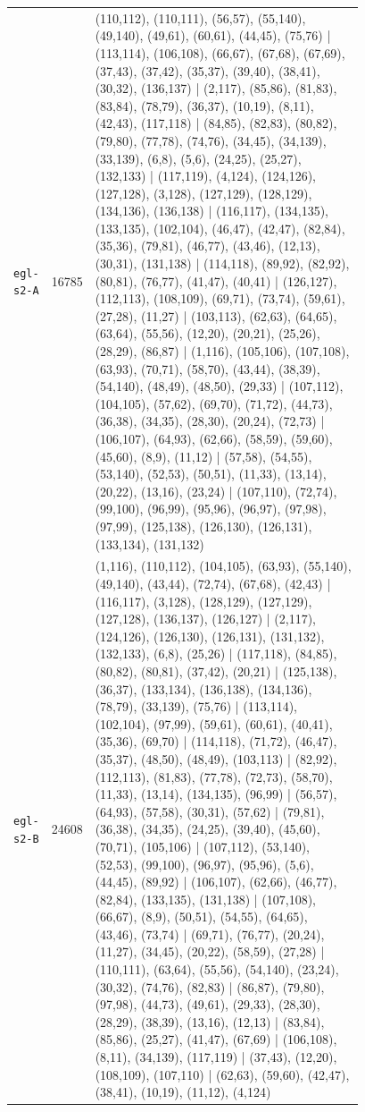 \begin{landscape}
\begin{longtable}{lr>{\tiny\raggedright\arraybackslash}p{0.78\linewidth}}
\texttt{egl-s2-A} & 16785 & (110,112), (110,111), (56,57), (55,140), (49,140), (49,61), (60,61), (44,45), (75,76) | (113,114), (106,108), (66,67), (67,68), (67,69), (37,43), (37,42), (35,37), (39,40), (38,41), (30,32), (136,137) | (2,117), (85,86), (81,83), (83,84), (78,79), (36,37), (10,19), (8,11), (42,43), (117,118) | (84,85), (82,83), (80,82), (79,80), (77,78), (74,76), (34,45), (34,139), (33,139), (6,8), (5,6), (24,25), (25,27), (132,133) | (117,119), (4,124), (124,126), (127,128), (3,128), (127,129), (128,129), (134,136), (136,138) | (116,117), (134,135), (133,135), (102,104), (46,47), (42,47), (82,84), (35,36), (79,81), (46,77), (43,46), (12,13), (30,31), (131,138) | (114,118), (89,92), (82,92), (80,81), (76,77), (41,47), (40,41) | (126,127), (112,113), (108,109), (69,71), (73,74), (59,61), (27,28), (11,27) | (103,113), (62,63), (64,65), (63,64), (55,56), (12,20), (20,21), (25,26), (28,29), (86,87) | (1,116), (105,106), (107,108), (63,93), (70,71), (58,70), (43,44), (38,39), (54,140), (48,49), (48,50), (29,33) | (107,112), (104,105), (57,62), (69,70), (71,72), (44,73), (36,38), (34,35), (28,30), (20,24), (72,73) | (106,107), (64,93), (62,66), (58,59), (59,60), (45,60), (8,9), (11,12) | (57,58), (54,55), (53,140), (52,53), (50,51), (11,33), (13,14), (20,22), (13,16), (23,24) | (107,110), (72,74), (99,100), (96,99), (95,96), (96,97), (97,98), (97,99), (125,138), (126,130), (126,131), (133,134), (131,132) \\[2pt]
\texttt{egl-s2-B} & 24608 & (1,116), (110,112), (104,105), (63,93), (55,140), (49,140), (43,44), (72,74), (67,68), (42,43) | (116,117), (3,128), (128,129), (127,129), (127,128), (136,137), (126,127) | (2,117), (124,126), (126,130), (126,131), (131,132), (132,133), (6,8), (25,26) | (117,118), (84,85), (80,82), (80,81), (37,42), (20,21) | (125,138), (36,37), (133,134), (136,138), (134,136), (78,79), (33,139), (75,76) | (113,114), (102,104), (97,99), (59,61), (60,61), (40,41), (35,36), (69,70) | (114,118), (71,72), (46,47), (35,37), (48,50), (48,49), (103,113) | (82,92), (112,113), (81,83), (77,78), (72,73), (58,70), (11,33), (13,14), (134,135), (96,99) | (56,57), (64,93), (57,58), (30,31), (57,62) | (79,81), (36,38), (34,35), (24,25), (39,40), (45,60), (70,71), (105,106) | (107,112), (53,140), (52,53), (99,100), (96,97), (95,96), (5,6), (44,45), (89,92) | (106,107), (62,66), (46,77), (82,84), (133,135), (131,138) | (107,108), (66,67), (8,9), (50,51), (54,55), (64,65), (43,46), (73,74) | (69,71), (76,77), (20,24), (11,27), (34,45), (20,22), (58,59), (27,28) | (110,111), (63,64), (55,56), (54,140), (23,24), (30,32), (74,76), (82,83) | (86,87), (79,80), (97,98), (44,73), (49,61), (29,33), (28,30), (28,29), (38,39), (13,16), (12,13) | (83,84), (85,86), (25,27), (41,47), (67,69) | (106,108), (8,11), (34,139), (117,119) | (37,43), (12,20), (108,109), (107,110) | (62,63), (59,60), (42,47), (38,41), (10,19), (11,12), (4,124) \\[2pt]

\end{longtable}
\end{landscape}
